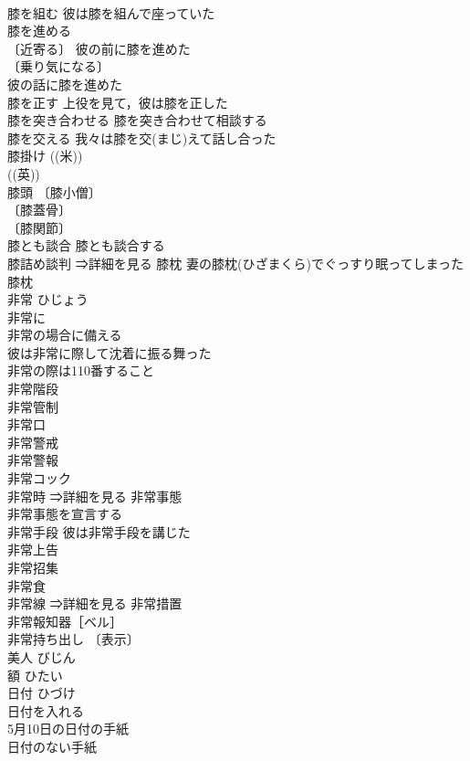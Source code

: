 \documentclass[8pt]{extreport}
\begin{document}
\begin{CJK}{UTF8}{min}
\\	膝を組む 彼は膝を組んで座っていた 
\\	膝を進める 
\\	〔近寄る〕 彼の前に膝を進めた 
\\	〔乗り気になる〕
\\	彼の話に膝を進めた 
\\	膝を正す 上役を見て，彼は膝を正した 
\\	膝を突き合わせる 膝を突き合わせて相談する 
\\	膝を交える 我々は膝を交(まじ)えて話し合った 
\\	膝掛け ((米)) 
\\	((英)) 
\\	膝頭 〔膝小僧〕
\\	〔膝蓋骨〕
\\	〔膝関節〕
\\	膝とも談合 膝とも談合する 
\\	膝詰め談判 ⇒詳細を見る 膝枕 妻の膝枕(ひざまくら)でぐっすり眠ってしまった 
\\	膝枕 
\\	非常	ひじょう	
\\	非常に 
\\	非常の場合に備える 
\\	彼は非常に際して沈着に振る舞った 
\\	非常の際は110番すること 
\\	非常階段 
\\	非常管制 
\\	非常口 
\\	非常警戒 
\\	非常警報 
\\	非常コック 
\\	非常時 ⇒詳細を見る 非常事態 
\\	非常事態を宣言する 
\\	非常手段 彼は非常手段を講じた 
\\	非常上告 
\\	非常招集 
\\	非常食 
\\	非常線 ⇒詳細を見る 非常措置 
\\	非常報知器［ベル］ 
\\	非常持ち出し 〔表示〕
\\	美人	びじん	
\\	額	ひたい	
\\	日付	ひづけ	
\\	日付を入れる 
\\	5月10日の日付の手紙 
\\	日付のない手紙 

\end{CJK}
\end{document}
